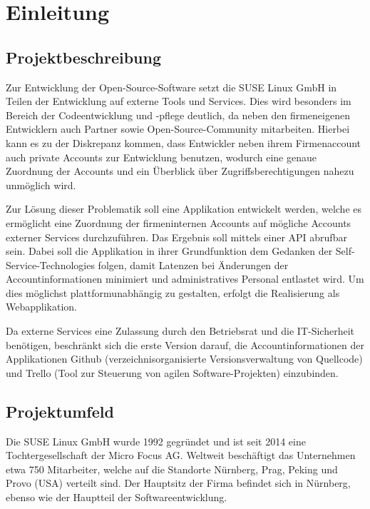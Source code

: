 \section{Einleitung}
\label{sec:Einleitung}

\subsection{Projektbeschreibung}
\label{sec:Projektbeschreibung}
Zur Entwicklung der Open-Source-Software setzt die SUSE Linux GmbH in Teilen der Entwicklung
auf externe Tools und Services. Dies wird besonders im Bereich der Codeentwicklung und -pflege
deutlich, da neben den firmeneigenen Entwicklern auch Partner sowie Open-Source-Community
mitarbeiten. Hierbei kann es zu der Diskrepanz kommen, dass Entwickler neben ihrem Firmenaccount
auch private Accounts zur Entwicklung benutzen, wodurch eine genaue Zuordnung der Accounts und
ein Überblick über Zugriffsberechtigungen nahezu unmöglich wird.

Zur Lösung dieser Problematik soll eine Applikation entwickelt werden, welche es ermöglicht
eine Zuordnung der firmeninternen Accounts auf mögliche Accounts externer Services durchzuführen.
Das Ergebnis soll mittels einer API abrufbar sein.
Dabei soll die Applikation in ihrer Grundfunktion dem Gedanken der Self-Service-Technologies folgen,
damit Latenzen bei Änderungen der Accountinformationen minimiert und administratives Personal
entlastet wird. Um dies möglichst plattformunabhängig zu gestalten, erfolgt die Realisierung als
Webapplikation.

Da externe Services eine Zulassung durch den Betriebsrat und die IT-Sicherheit benötigen, beschränkt
sich die erste Version darauf, die Accountinformationen der Applikationen Github
(verzeichnisorganisierte Versionsverwaltung von Quellcode) und Trello (Tool zur Steuerung von
agilen Software-Projekten) einzubinden.

\subsection{Projektumfeld}
\label{sec:Projektumfeld}
Die SUSE Linux GmbH wurde 1992 gegründet und ist seit 2014 eine Tochtergesellschaft der Micro Focus
AG. Weltweit beschäftigt das Unternehmen etwa 750 Mitarbeiter, welche auf die Standorte Nürnberg,
Prag, Peking und Provo (USA) verteilt sind. Der Hauptsitz der Firma befindet sich in Nürnberg,
ebenso wie der Hauptteil der Softwareentwicklung.

